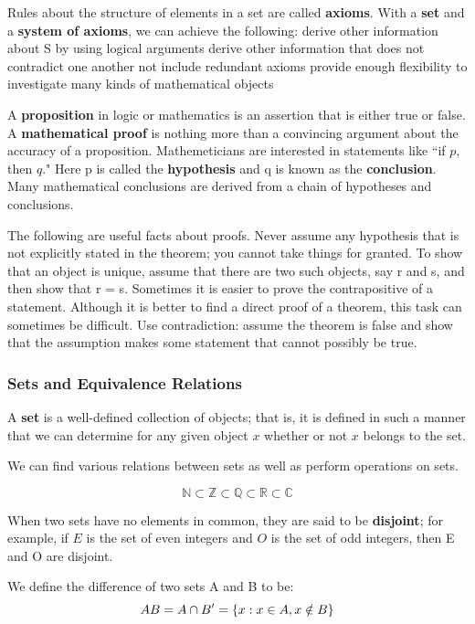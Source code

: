 \documentclass[11pt]{article} %
\begin{document}
\noindent
Rules about the structure of elements in a set are called \textbf{axioms}. With a \textbf{set} and a \textbf{system of axioms}, we can achieve the following:
\points
{derive other information about S by using logical arguments}
{derive other information that does not contradict one another}
{not include redundant axioms}
{provide enough flexibility to investigate many kinds of mathematical objects}

\noindent
A \textbf{proposition} in logic or mathematics is an assertion that is either true or false. A \textbf{mathematical proof} is nothing more than a convincing argument about the accuracy of a proposition. Mathemeticians are interested in statements like ``if $p$, then $q$." Here p is
called the \textbf{hypothesis} and q is known as the \textbf{conclusion}. Many mathematical conclusions are derived from a chain of hypotheses and conclusions.

The following are useful facts about proofs. Never assume any hypothesis that is not explicitly stated in the theorem; you cannot take things for granted. To show that an object is unique, assume that there are two such objects, say r and s, and then show that r = s. Sometimes it is easier to prove the contrapositive of a statement. Although it is better to find a direct proof of a theorem, this task can sometimes be difficult. Use contradiction: assume the theorem is false and show that the assumption makes some statement that cannot possibly be true.

\subsubsection{Sets and Equivalence Relations}
{A \textbf{set} is a well-defined collection of objects; that is, it is defined in such a manner that we can determine for any given object $x$ whether or not $x$ belongs to the set.}

We can find various relations between sets as well as perform operations on sets.

{$$
\mathbb{N} \subset \mathbb{Z} \subset \mathbb{Q} \subset \mathbb{R} \subset \mathbb{C}
$$}

When two sets have no elements in common, they are said to be \textbf{disjoint}; for example, if $E$ is the set of even integers and $O$ is the set of odd integers, then E and O are disjoint.

{We define the difference of two sets A and B to be:
$$
A \\ B = A \cap B' = \{ x : x \in A, x \notin B\}
$$}
\end{document}
